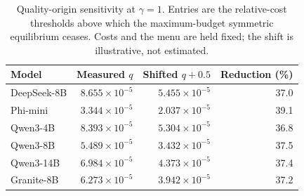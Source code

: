 \begin{table}[htbp]
\centering\small
\caption{Quality-origin sensitivity at $\gamma=1$. Entries are the relative-cost thresholds above which the maximum-budget symmetric equilibrium ceases. Costs and the menu are held fixed; the shift is illustrative, not estimated.}
\label{tab:qualityoriginsensitivity}
\begin{tabular}{lrrr}
\toprule
Model & Measured $q$ & Shifted $q+0.5$ & Reduction (\%) \\
\midrule
DeepSeek-8B & $8.655\times10^{-5}$ & $5.455\times10^{-5}$ & 37.0 \\
Phi-mini & $3.344\times10^{-5}$ & $2.037\times10^{-5}$ & 39.1 \\
Qwen3-4B & $8.393\times10^{-5}$ & $5.304\times10^{-5}$ & 36.8 \\
Qwen3-8B & $5.489\times10^{-5}$ & $3.432\times10^{-5}$ & 37.5 \\
Qwen3-14B & $6.984\times10^{-5}$ & $4.373\times10^{-5}$ & 37.4 \\
Granite-8B & $6.273\times10^{-5}$ & $3.942\times10^{-5}$ & 37.2 \\
\bottomrule
\end{tabular}
\end{table}
